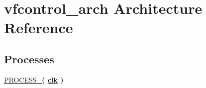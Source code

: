 \hypertarget{classvfcontrol_1_1vfcontrol__arch}{}\section{vfcontrol\+\_\+arch Architecture Reference}
\label{classvfcontrol_1_1vfcontrol__arch}
\subsection*{Processes}
 \begin{DoxyCompactItemize}
\item 
\hyperlink{classvfcontrol_1_1vfcontrol__arch_aae9b98e25b80f11c0a2d412223b4fe8f}{P\+R\+O\+C\+E\+S\+S\+\_}{\bfseries  ( {\bfseries {\bfseries \hyperlink{classvfcontrol_a4a4609c199d30b3adebbeb3a01276ec5}{clk}} \textcolor{vhdlchar}{ }} )}
\end{DoxyCompactItemize}
